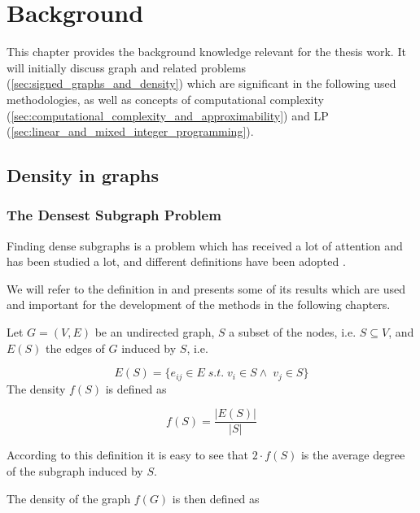 \chapter{Background}
\label{ch:background}

This chapter provides the background knowledge relevant for the thesis work. It
will initially discuss graph and related problems (\autoref{sec:signed_graphs_and_density}) which are significant in the
following used methodologies, as well as concepts of computational complexity
(\autoref{sec:computational_complexity_and_approximability}) and \acrlong{LP} (\autoref{sec:linear_and_mixed_integer_programming}).

\section{Density in graphs}%
\label{sec:signed_graphs_and_density}

\subsection{The Densest Subgraph Problem}%
\label{sub:densest_subgraphs}

Finding dense subgraphs is a problem which has received a lot of attention and
has been studied a lot, and different definitions have been adopted
\cite{charikar2000greedy}\cite{asahiro1995finding}\cite{asahiro2000greedily}
\cite{feige1997densest}.

We will refer to the definition in \cite{charikar2000greedy} and presents some
of its results which are used and important for the development of the methods
in the following chapters.

\medskip

Let $G = (V, E)$ be an undirected graph, $S$ a subset of the nodes, i.e. $S
	\subseteq V$, and $E(S)$ the edges of $G$ induced by $S$, i.e.

\begin{equation*}
	E(S) = \{e_{ij} \in E \; s.t. \; v_i \in S \land \; v_j \in S\}
\end{equation*}
The density $f(S)$ is defined as

\begin{equation}
	f(S) = \frac{|E(S)|}{|S|}
\end{equation}

According to this definition it is easy to see that $2 \cdot f(S)$ is the
average degree of the subgraph induced by $S$.

The density of the graph $f(G)$ is then defined as

